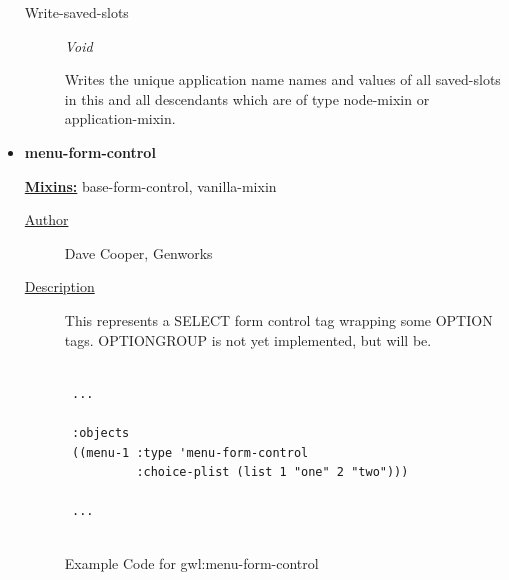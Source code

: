 \documentclass [11pt]{book}
\begin{document}
\begin{itemize}
\begin{description}
\item [Write-saved-slots]
\emph{Void}

 Writes the unique application name names and values of all saved-slots in this and all
descendants which are of type node-mixin or application-mixin.





\end{description}







\item {}
\label{prim:menu-form-control}
\textbf{menu-form-control}


\textbf{
\underline{Mixins:}} base-form-control, vanilla-mixin





\begin{description}

\item [
\underline{Author}]


Dave Cooper, Genworks



\item [
\underline{Description}]


This represents a SELECT form control tag wrapping some OPTION tags.
OPTIONGROUP is not yet implemented, but will be.



\end{description}




\begin{figure}
\begin{lrbox}{\boxedverb}
\begin{minipage}{\linewidth}
{\small

\begin{verbatim}

 ...
 
 :objects
 ((menu-1 :type 'menu-form-control
          :choice-plist (list 1 "one" 2 "two")))

 ...


\end{verbatim}}
\end{minipage}
\end{lrbox}
\fbox{\usebox{\boxedverb}}

\caption{Example Code for gwl:menu-form-control}


\end{figure}
\end{itemize}
\end{document}
